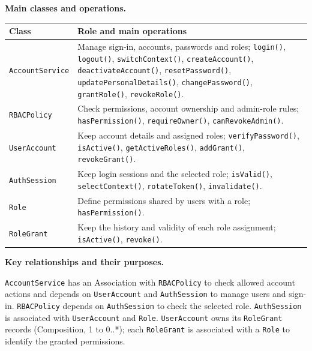 \noindent\textbf{Main classes and operations.}\par\smallskip
\begingroup\small
\noindent\begin{tabularx}{\textwidth}{|L{0.34\textwidth}|Y|}
\hline
\textbf{Class} & \textbf{Role and main operations} \\ \hline

\texttt{AccountService} &
Manage sign-in, accounts, passwords and roles;
\texttt{login()}, \texttt{logout()}, \texttt{switchContext()},
\texttt{createAccount()}, \texttt{deactivateAccount()},
\texttt{resetPassword()}, \texttt{updatePersonalDetails()},
\texttt{changePassword()}, \texttt{grantRole()},
\texttt{revokeRole()}. \\ \hline

\texttt{RBACPolicy} &
Check permissions, account ownership and admin-role rules;
\texttt{hasPermission()}, \texttt{requireOwner()},
\texttt{canRevokeAdmin()}. \\ \hline

\texttt{UserAccount} &
Keep account details and assigned roles;
\texttt{verifyPassword()}, \texttt{isActive()},
\texttt{getActiveRoles()}, \texttt{addGrant()},
\texttt{revokeGrant()}. \\ \hline

\texttt{AuthSession} &
Keep login sessions and the selected role;
\texttt{isValid()}, \texttt{selectContext()},
\texttt{rotateToken()}, \texttt{invalidate()}. \\ \hline

\texttt{Role} &
Define permissions shared by users with a role;
\texttt{hasPermission()}. \\ \hline

\texttt{RoleGrant} &
Keep the history and validity of each role assignment;
\texttt{isActive()}, \texttt{revoke()}. \\ \hline

\end{tabularx}\par
\endgroup

\noindent\textbf{Key relationships and their purposes.}\par\smallskip
\texttt{AccountService} has an Association with \texttt{RBACPolicy}
to check allowed account actions and depends on \texttt{UserAccount} and
\texttt{AuthSession} to manage users and sign-in. \texttt{RBACPolicy}
depends on \texttt{AuthSession} to check the selected role.
\texttt{AuthSession} is associated with \texttt{UserAccount} and
\texttt{Role}. \texttt{UserAccount} owns its \texttt{RoleGrant}
records (Composition, 1 to 0..*); each \texttt{RoleGrant} is associated
with a \texttt{Role} to identify the granted permissions.


